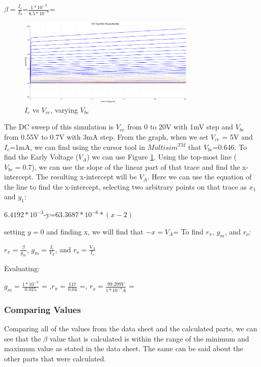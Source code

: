 \documentclass[12pt]{article}
\begin{document}
\newline
\begin{center}
$\beta= \frac{I_c}{I_b}$=$\frac{1*10^{-3}}{8.5*10^{-6}}$= 
\end{center}
\begin{figure}[H]
\centering
\includegraphics[width=0.75\textwidth]{Images/ic__vs_vce_vbe.png}
\caption{$I_c$ vs $V_{ce}$, varying $V_{be}$}
\label{fig:icvcevbe}
\end{figure}
The DC sweep of this simulation is $V_{ce}$ from 0 to 20V with 1mV step and $V_{be}$ from 0.55V to 0.7V with 3mA step. From the graph, when we set $V_{ce}$ = 5V and $I_c$=1mA, we can find using the cursor tool in $Multisim^{TM}$ that $V_{be}$=0.646. To find the Early Voltage ($V_A$) we can use Figure \ref{fig:icvcevbe}. Using the top-most line ($V_{be}=0.7$), we can use the slope of the linear part of that trace and find the x-intercept. The resulting x-intercept will be $V_A$. Here we can use the equation of the line to find the x-intercept, selecting two arbitrary points on that trace as $x_1$ and $y_1$:
\begin{center}
    $6.4192*10^{-3}$-y=$63.3687*10^{-6}*(x-2)$
\end{center}
setting $y=0$ and finding x, we will find that $-x=V_A$=
\newline
\newline
To find $r_{\pi}$, $g_m$, and $r_o$:
\begin{center}
    $r_{\pi}=\frac{\beta}{g_m}$, $g_m=\frac{I_c}{V_T}$, and $r_o =\frac{V_A}{I_c}$
\end{center}
Evaluating:
\begin{center}
 $g_m=\frac{1*10^{-3}}{0.025}$ = ,$r_{\pi}=\frac{117}{0.04}$ =, $r_o =\frac{99.299V}{1*10^{-3}A}$ = 
\end{center}
\subsubsection{Comparing Values}
Comparing all of the values from the data sheet and the calculated parts, we can see that the $\beta$ value that is calculated is within the range of the minimum and maximum value as stated in the data sheet. The same can be said about the other parts that were calculated.
\end{document}
